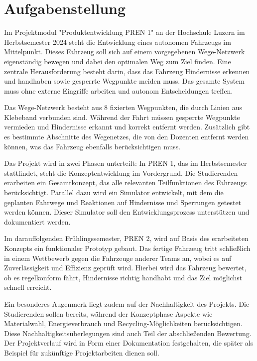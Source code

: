 \newpage
\section{Aufgabenstellung}
Im Projektmodul "Produktentwicklung PREN 1" an der Hochschule Luzern im Herbstsemester 2024 steht die Entwicklung eines autonomen Fahrzeugs im Mittelpunkt. Dieses Fahrzeug soll sich auf einem vorgegebenen Wege-Netzwerk eigenständig bewegen und dabei den optimalen Weg zum Ziel finden. Eine zentrale Herausforderung besteht darin, dass das Fahrzeug Hindernisse erkennen und handhaben sowie gesperrte Wegpunkte meiden muss. Das gesamte System muss ohne externe Eingriffe arbeiten und autonom Entscheidungen treffen. 

Das Wege-Netzwerk besteht aus 8 fixierten Wegpunkten, die durch Linien aus Klebeband verbunden sind. Während der Fahrt müssen gesperrte Wegpunkte vermieden und Hindernisse erkannt und korrekt entfernt werden. Zusätzlich gibt es bestimmte Abschnitte des Wegenetzes, die von den Dozenten entfernt werden können, was das Fahrzeug ebenfalls berücksichtigen muss. 

Das Projekt wird in zwei Phasen unterteilt: In PREN 1, das im Herbstsemester stattfindet, steht die Konzeptentwicklung im Vordergrund. Die Studierenden erarbeiten ein Gesamtkonzept, das alle relevanten Teilfunktionen des Fahrzeugs berücksichtigt. Parallel dazu wird ein Simulator entwickelt, mit dem die geplanten Fahrwege und Reaktionen auf Hindernisse und Sperrungen getestet werden können. Dieser Simulator soll den Entwicklungsprozess unterstützen und dokumentiert werden. 

Im darauffolgenden Frühlingssemester, PREN 2, wird auf Basis des erarbeiteten Konzepts ein funktionaler Prototyp gebaut. Das fertige Fahrzeug tritt schließlich in einem Wettbewerb gegen die Fahrzeuge anderer Teams an, wobei es auf Zuverlässigkeit und Effizienz geprüft wird. Hierbei wird das Fahrzeug bewertet, ob es regelkonform fährt, Hindernisse richtig handhabt und das Ziel möglichst schnell erreicht. 

Ein besonderes Augenmerk liegt zudem auf der Nachhaltigkeit des Projekts. Die Studierenden sollen bereits, während der Konzeptphase Aspekte wie Materialwahl, Energieverbrauch und Recycling-Möglichkeiten berücksichtigen. Diese Nachhaltigkeitsüberlegungen sind auch Teil der abschließenden Bewertung. Der Projektverlauf wird in Form einer Dokumentation festgehalten, die später als Beispiel für zukünftige Projektarbeiten dienen soll. 
